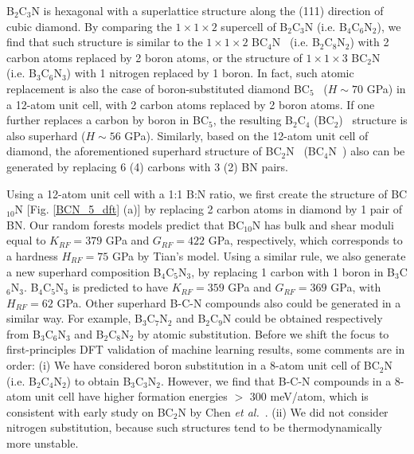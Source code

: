 	B$_2$C$_3$N is hexagonal with a superlattice structure along the (111) direction of cubic diamond. By comparing the $1\times 1 \times 2$ supercell of B$_2$C$_3$N (i.e. B$_4$C$_6$N$_2$), we find that such structure is similar to the $1\times 1 \times 2$ BC$_4$N~\cite{BC4N_Luo2008} (i.e. B$_2$C$_8$N$_2$) with 2 carbon atoms replaced by 2 boron atoms, or the structure of $1\times 1 \times 3$ BC$_2$N~\cite{BC2N_Liu2018} (i.e. B$_3$C$_6$N$_3$) with 1 nitrogen replaced by 1 boron. 
	In fact, such atomic replacement is also the case of boron-substituted diamond BC$_5$~\cite{PhysRevB.80.094106} ($H \sim 70$ GPa) in a 12-atom unit cell, with 2 carbon atoms replaced by 2 boron atoms. If one further replaces a carbon by boron in BC$_5$, the resulting B$_2$C$_4$ (BC$_2$)~\cite{Xu2010} structure is also superhard ($H \sim 56$ GPa). 
	Similarly, based on the 12-atom unit cell of diamond, the aforementioned superhard structure of BC$_2$N~\cite{BC2N_Liu2018} (BC$_4$N~\cite{BC4N_Luo2008}) also can be generated by replacing 6 (4) carbons with 3 (2) BN pairs.
	
	Using a 12-atom unit cell with a 1:1 B:N ratio, we first create the structure of BC$_{10}$N [Fig. \ref{BCN_5_dft} (a)] by replacing 2 carbon atoms in diamond by 1 pair of BN. Our random forests models predict that BC$_{10}$N has bulk and shear moduli equal to $K_{RF}=379$ GPa and $G_{RF}= 422$ GPa, respectively, which corresponds to a hardness $H_{RF}=75$ GPa by Tian's model.
	Using a similar rule, we also generate a new superhard composition B$_4$C$_5$N$_3$, by replacing 1 carbon with 1 boron in B$_3$C$_6$N$_3$.
	B$_4$C$_5$N$_3$ is predicted to have $K_{RF}=359$ GPa and $G_{RF}=369$ GPa, with $H_{RF}=62$ GPa.
	Other superhard B-C-N compounds also could be generated in a similar way. For example, B$_3$C$_7$N$_2$ and B$_2$C$_9$N could be obtained respectively from B$_3$C$_6$N$_3$ and B$_2$C$_8$N$_2$ by atomic substitution.
	Before we shift the focus to first-principles DFT validation of machine learning results, some comments are in order:
	(i) We have considered boron substitution in a 8-atom unit cell of BC$_2$N (i.e. B$_2$C$_4$N$_2$) to obtain B$_3$C$_3$N$_2$. However, we find that B-C-N compounds in a 8-atom unit cell have higher formation energies $>$ 300 meV/atom, which is consistent with early study on BC$_2$N by Chen {\it et al.}~\cite{PhysRevLett.98.015502}. (ii) We did not consider nitrogen substitution, because such structures tend to be thermodynamically more unstable.
	
